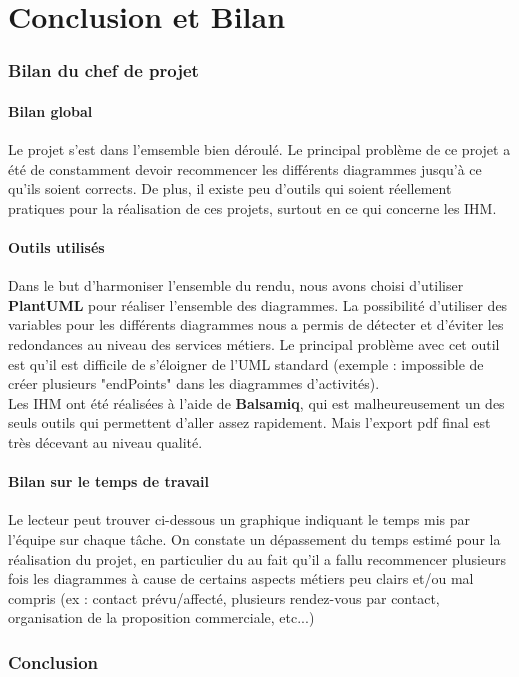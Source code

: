 \part{Conclusion et Bilan}
\setcounter{section}{0}

\section{Bilan du chef de projet}

\subsection{Bilan global}
Le projet s'est dans l'emsemble bien déroulé. Le principal problème de ce projet a été de constamment devoir recommencer les différents diagrammes jusqu'à ce qu'ils soient corrects. De plus, il existe peu d'outils qui soient réellement pratiques pour la réalisation de ces projets, surtout en ce qui concerne les IHM.

\subsection{Outils utilisés}
Dans le but d'harmoniser l'ensemble du rendu, nous avons choisi d'utiliser \textbf{PlantUML} pour réaliser l'ensemble des diagrammes. La possibilité d'utiliser des variables pour les différents diagrammes nous a permis de détecter et d'éviter les redondances au niveau des services métiers. Le principal problème avec cet outil est qu'il est difficile de s'éloigner de l'UML standard (exemple : impossible de créer plusieurs "endPoints" dans les diagrammes d'activités).\\

Les IHM ont été réalisées à l'aide de \textbf{Balsamiq}, qui est malheureusement un des seuls outils qui permettent d'aller assez rapidement. Mais l'export pdf final est très décevant au niveau qualité. 

\subsection{Bilan sur le temps de travail}
Le lecteur peut trouver ci-dessous un graphique indiquant le temps mis par l'équipe sur chaque tâche.
On constate un dépassement du temps estimé pour la réalisation du projet, en particulier du au fait qu'il a fallu recommencer plusieurs fois les diagrammes à cause de certains aspects métiers peu clairs et/ou mal compris (ex : contact prévu/affecté, plusieurs rendez-vous par contact, organisation de la proposition commerciale, etc...)




\section{Conclusion}